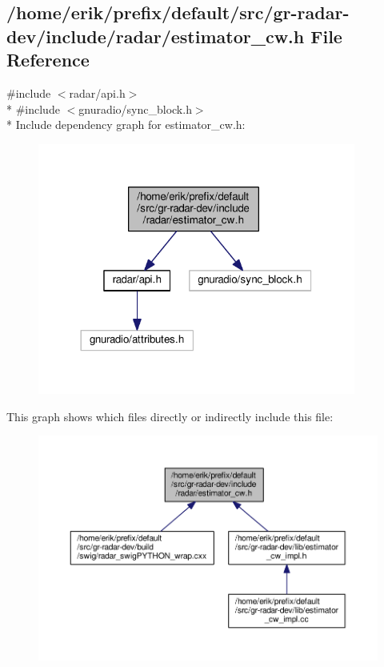 \subsection{/home/erik/prefix/default/src/gr-\/radar-\/dev/include/radar/estimator\+\_\+cw.h File Reference}
\label{estimator__cw_8h}
{\ttfamily \#include $<$radar/api.\+h$>$}\\*
{\ttfamily \#include $<$gnuradio/sync\+\_\+block.\+h$>$}\\*
Include dependency graph for estimator\+\_\+cw.\+h\+:
\nopagebreak
\begin{figure}[H]
\begin{center}
\leavevmode
\includegraphics[width=296pt]{de/d03/estimator__cw_8h__incl}
\end{center}
\end{figure}
This graph shows which files directly or indirectly include this file\+:
\nopagebreak
\begin{figure}[H]
\begin{center}
\leavevmode
\includegraphics[width=350pt]{d7/d74/estimator__cw_8h__dep__incl}
\end{center}
\end{figure}
